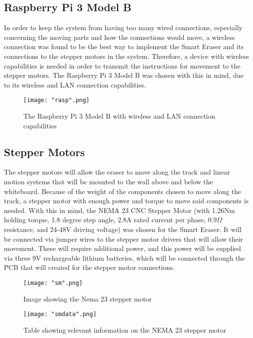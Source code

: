 \subsection{Raspberry Pi 3 Model B}

In order to keep the system from having too many wired connections, especially concerning the moving parts and how the connections would move, a wireless connection was found to be the best way to implement the Smart Eraser and its connections to the stepper motors in the system. Therefore, a device with wireless capabilities is needed in order to transmit the instructions for movement to the stepper motors. The Raspberry Pi 3 Model B was chosen with this in mind, due to its wireless and LAN connection capabilities. 

\begin{figure}[H]
	\centering
	{\texttt{[image: "rasp".png]}}
	\caption{The Raspberry Pi 3 Model B with wireless and LAN connection capabilities\cite{raspB} }
	\label{fig:rasp}
\end{figure}

\subsection{Stepper Motors}
The stepper motors will allow the eraser to move along the track and linear motion systems that will be mounted to the wall above and below the whiteboard. Because of the weight of the components chosen to move along the track, a stepper motor with enough power and torque to move said components is needed. With this in mind, the NEMA 23 CNC Stepper Motor (with 1.26Nm holding torque, 1.8 degree step angle, 2.8A rated current per phase, 0.9$\Omega$ resistance, and 24-48V driving voltage) was chosen for the Smart Eraser. It will be connected via jumper wires to the stepper motor drivers that will allow their movement. These will require additional power, and this power will be supplied via three 9V rechargeable lithium batteries, which will be connected through the PCB that will created for the stepper motor connections.

\begin{figure}[H]
	\centering
	{\texttt{[image: "sm".png]}}
	\caption{ Image showing the Nema 23 stepper motor \cite{smR} }
	\label{fig:sm}
\end{figure}

\begin{figure}[H]
	\centering
	{\texttt{[image: "smdata".png]}}
	\caption{Table showing relevant information on the NEMA 23 stepper motor\cite{smdataR}}
	\label{fig:smd}
\end{figure}

